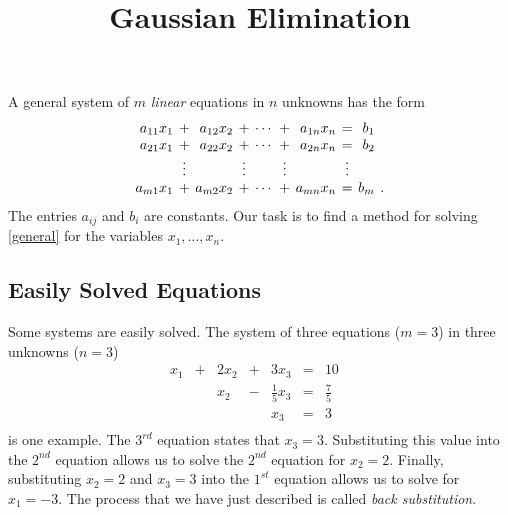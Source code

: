 \documentclass{ximera}
\title{Gaussian Elimination}
\begin{document}
\begin{abstract}
\end{abstract}
\maketitle

  \label{S:Gauss}

A general system of $m$ {\em linear\/} equations 
in $n$ unknowns has the form
\begin{equation}    \label{general}
\arraycolsep 2pt
\begin{array}{rcrcrcrcrl}
 a_{11}x_1 & + & a_{12}x_2 & + & \cdots & + & a_{1n}x_n & = &   b_1
& \\
 a_{21}x_1 & + & a_{22}x_2 & + & \cdots & + & a_{2n}x_n & = &   b_2
& \\
        & \vdots &      & \vdots &    & \vdots &     & \vdots &
  & \\
 a_{m1}x_1 & + & a_{m2}x_2 & + & \cdots & + & a_{mn}x_n & = &   b_m
& .
\end{array}
\end{equation}
The entries $a_{ij}$ and $b_i$ are constants.  Our task is to find
a method for solving \eqref{general} for the variables
$x_1,\ldots,x_n$.

\subsection*{Easily Solved Equations}

Some systems are easily solved.  The system of three
equations ($m=3$) in three unknowns ($n=3$)
\begin{equation}
\begin{array}{rcrcrcrl} \label{examp3}
  x_1 & + & 2x_2 & + & 3x_3 & = &  10  & \\
      &   &  x_2 & - & \frac{1}{5}x_3 & = & \frac{7}{5}  & \\
      &   &      &   &  x_3 & = &   3  & \\
\end{array}
\end{equation}
is one example.  The $3^{rd}$ equation states that $x_3=3$.
Substituting this value into the $2^{nd}$ equation allows us to
solve the $2^{nd}$ equation for $x_2=2$.  Finally, substituting
$x_2=2$ and $x_3=3$ into the $1^{st}$ equation allows us to
solve for $x_1=-3$.  The process that we have just described is
called {\em back substitution\/}.
\end{document}
